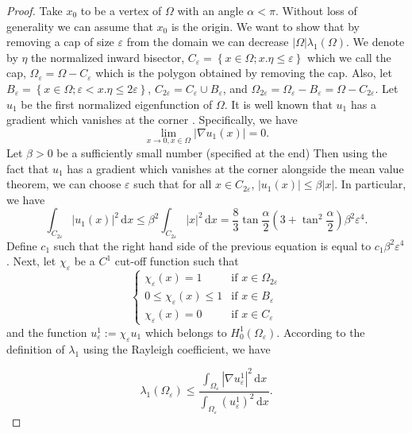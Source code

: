 \documentclass[12pt]{report}
\numberwithin{definition}{section}
\begin{document}
\begin{proof}
  Take $x_{0}$ to be a vertex of $\Omega$ with an angle $\alpha < \pi$.
  Without loss of generality we can assume that $x_{0}$ is the origin.
  We want to show that by removing a cap of size $\varepsilon$ from the domain we can decrease $| \Omega |\lambda_{1}(\Omega)$.
  We denote by $\eta$ the normalized inward bisector, $C_{\varepsilon} = \left\{ x \in \Omega;x.\eta \leq \varepsilon \right\}$ which we call the cap, $\Omega_{\varepsilon} = \Omega - C_{\varepsilon}$ which is the polygon obtained by removing the cap.
  Also, let $B_{\varepsilon} = \left\{ x \in \Omega; \varepsilon < x.\eta \leq 2 \varepsilon \right\}$, $C_{2 \varepsilon} = C_{\varepsilon} \cup B_{\varepsilon}$, and $\Omega_{2 \varepsilon} =  \Omega_{\varepsilon} - B_{\varepsilon} = \Omega - C_{2 \varepsilon}$.
  Let $u_1$ be the first normalized eigenfunction of $\Omega$.
  It is well known that $u_1$ has a gradient which vanishes at the corner \cite{henrot}.
  Specifically, we have
  \[
  \lim_{x \to 0, x \in \Omega} | \nabla u_1(x) | = 0
  .\] 
  Let $\beta > 0$ be a sufficiently small number (specified at the end)
  Then using the fact that $u_1$ has a gradient which vanishes at the corner alongside the mean value theorem, we can choose $\varepsilon$ such that for all $x \in C_{2 \varepsilon}$, $| u_1(x) | \leq \beta | x |$. 
  In particular, we have
  \[
    \int_{ C_{2 \varepsilon}} \! | u_1(x) |^{2} \, \mathrm{d}x \leq \beta^{2} \int_{ C_{2 \varepsilon}} \! | x |^{2} \, \mathrm{d}x = \frac{8}{3} \tan \frac{\alpha}{2} \left( 3 + \tan^{2} \frac{\alpha}{2} \right ) \beta^{2} \varepsilon^{4}
  .\] 
  Define $c_{1}$ such that the right hand side of the previous equation is equal to $c_{1}\beta^{2}\varepsilon^{4}$.
  Next, let $\chi_{\varepsilon}$ be a $C^{1}$ cut-off function such that 
  \[ 
    \begin{cases}
      \chi_{\varepsilon}(x) = 1 & \text{if } x \in \Omega_{2 \varepsilon} \\
      0 \leq \chi_{\varepsilon}(x) \leq  1 & \text{if } x \in B_{\varepsilon} \\
      \chi_{\varepsilon}(x) = 0 & \text{if } x \in C_{\varepsilon}
    \end{cases}
  \] 
  and the function $u_{\varepsilon}^{1} := \chi_{\varepsilon} u_1$ which belongs to $H_{0}^{1}(\Omega_{\varepsilon})$.
  According to the definition of $\lambda_{1}$ using the Rayleigh coefficient, we have

  \[
  \lambda_{1}(\Omega_{\varepsilon}) \leq \frac{\int_{ \Omega_{\varepsilon}} \! | \nabla u_{\varepsilon}^{1} |^{2} \, \mathrm{d}x }{\int_{ \Omega_{\varepsilon}} \! (u_{\varepsilon}^{1})^{2} \, \mathrm{d}x }
  .\] 


\end{proof}
\end{document}
